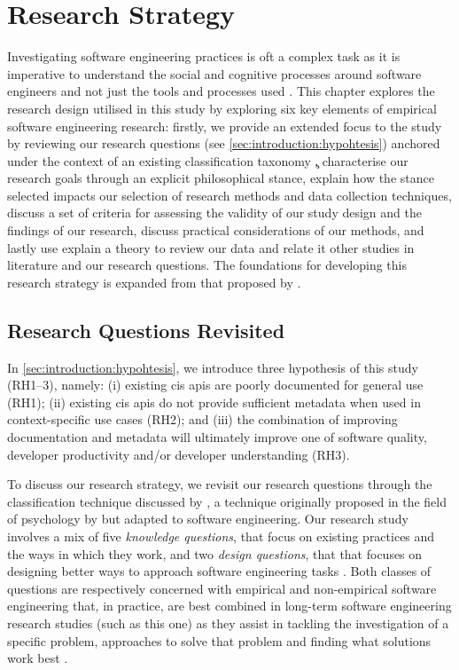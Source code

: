 \chapter{Research Strategy}

Investigating software engineering practices is oft a complex task as it is imperative to understand the social and cognitive processes around software engineers and not just the tools and processes used \citep{Easterbrook:2007ws}. This chapter explores the research design utilised in this study by exploring six key elements of empirical software engineering research: firstly, we provide an extended focus to the study by reviewing our research questions (see \cref{sec:introduction:hypohtesis}) anchored under the context of an existing classification taxonomy \c, characterise our research goals through an explicit philosophical stance, explain how the stance selected impacts our selection of research methods and data collection techniques, discuss a set of criteria for assessing the validity of our study design and the findings of our research, discuss practical considerations of our methods, and lastly use explain a theory to review our data and relate it other studies in literature and our research questions. The foundations for developing this research strategy is expanded from that proposed by \citet{Easterbrook:2007ws}.


\section{Research Questions Revisited}

In \cref{sec:introduction:hypohtesis}, we introduce three hypothesis of this study (RH1--3), namely: (i) existing \gls{cis} \glspl{api} are poorly documented for general use (RH1); (ii) existing \gls{cis} \glspl{api} do not provide sufficient metadata when used in context-specific use cases (RH2); and (iii) the combination of improving documentation and metadata will ultimately improve one of software quality, developer productivity and/or developer understanding (RH3).

To discuss our research strategy, we revisit our research questions through the classification technique discussed by \citet{Easterbrook:2007ws}, a technique originally proposed in the field of psychology by \citet{Meltzoff:1998wg} but adapted to software engineering. Our research study involves a mix of five \textit{knowledge questions}, that focus on existing practices and the ways in which they work, and two \textit{design questions}, that that focuses on designing better ways to approach software engineering tasks \citep{Simon:1996uw}. Both classes of questions are respectively concerned with empirical and non-empirical software engineering that, in practice, are best combined in long-term software engineering research studies (such as this one) as they assist in tackling the investigation of a specific problem, approaches to solve that problem and finding what solutions work best \citep{Wieringa:2006vd}.

